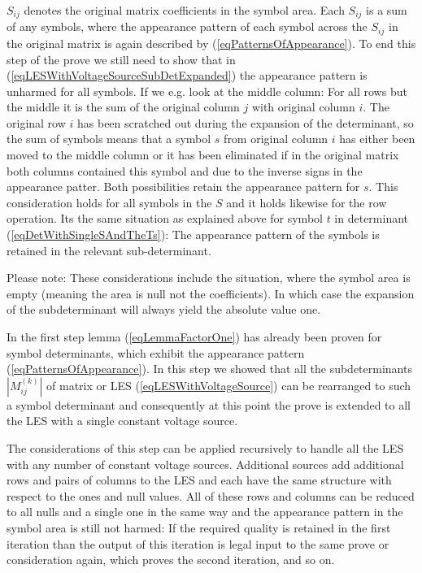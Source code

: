 $S_{ij}$ denotes the original matrix coefficients in the symbol area. Each
$S_{ij}$ is a sum of any symbols, where the appearance pattern of each
symbol across the $S_{ij}$ in the original matrix is again described by
(\ref{eqPatternsOfAppearance}). To end this step of the prove we still
need to show that in (\ref{eqLESWithVoltageSourceSubDetExpanded}) the
appearance pattern is unharmed for all symbols. If we e.g. look at the
middle column: For all rows but the middle it is the sum of the original
column $j$ with original column $i$. The original row $i$ has been
scratched out during the expansion of the determinant, so the sum of
symbols means that a symbol $s$ from original column $i$ has either been
moved to the middle column or it has been eliminated if in the original
matrix both columns contained this symbol and due to the inverse signs in
the appearance patter. Both possibilities retain the appearance pattern
for $s$. This consideration holds for all symbols in the $S$ and it holds
likewise for the row operation. Its the same situation as explained above
for symbol $t$ in determinant (\ref{eqDetWithSingleSAndTheTs}): The
appearance pattern of the symbols is retained in the relevant
sub-determinant.

Please note: These considerations include the situation, where the symbol
area is empty (meaning the area is null not the coefficients). In which
case the expansion of the subdeterminant will always yield the absolute
value one.

In the first step lemma (\ref{eqLemmaFactorOne}) has already been proven
for symbol determinants, which exhibit the appearance pattern
(\ref{eqPatternsOfAppearance}). In this step we showed that all the
subdeterminants $\left|M^{(k)}_{ij}\right|$ of matrix or LES
(\ref{eqLESWithVoltageSource}) can be rearranged to such a symbol
determinant and consequently at this point the prove is extended to all
the LES with a single constant voltage source.

The considerations of this step can be applied recursively to handle all
the LES with any number of constant voltage sources. Additional sources
add additional rows and pairs of columns to the LES and each have the same
structure with respect to the ones and null values. All of these rows and
columns can be reduced to all nulls and a single one in the same way and
the appearance pattern in the symbol area is still not harmed: If the
required quality is retained in the first iteration than the output of
this iteration is legal input to the same prove or consideration again,
which proves the second iteration, and so on.

